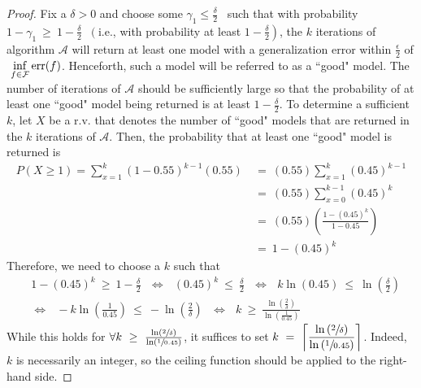 \documentclass[twoside,11pt]{homework}
\DeclarePairedDelimiter{\2norm}{\lVert}{\rVert^2_2}
\newcommand{\1}[1]{\mathds{1}\left[#1\right]}
\begin{document}
\begin{proof}
\noindent
Fix a $\delta > 0$ and choose some $\gamma_1 \leq \frac{\delta}{2}$ \ such that with probability $1- \gamma_1 \ \geq \ 1 - \frac{\delta}{2} \ $ $\left(\right.$i.e., with probability at least $\left.  1 - \frac{\delta}{2}\right)$, the $k$ iterations of algorithm $\mathcal{A}$ will return at least one model with a generalization error within $\frac{\epsilon}{2}$  of $ \ \mathlarger{\inf_{f \in \mathcal{F}}\text{err}(f)}$. Henceforth, such a model will be referred to as a ``good" model. The number of iterations of $\mathcal{A}$ should be sufficiently large so that the probability of at least one ``good" model being returned is at least $1 - \frac{\delta}{2}$. To determine a sufficient $k$, let $X$ be a r.v. that denotes the number of ``good" models that are returned in the $k$ iterations of $\mathcal{A}$. Then, the probability that at least one ``good" model is returned is
\begin{align*}
P(X \geq 1) = \sum_{x = 1}^k  (1-0.55)^{k-1}(0.55) \ & = \ (0.55)\sum_{x = 1}^k  (0.45)^{k-1} \\[0.5em]
& = \ (0.55)\sum_{x = 0}^{k-1}  (0.45)^{k} \\[0.5em]
& = \ (0.55)\left(\frac{1 - (0.45)^k}{1 - 0.45}\right) \\[0.5em]
& = \ 1 - (0.45)^k
\end{align*}
Therefore, we need to choose a $k$ such that
\begin{align*}
& 1 - (0.45)^k \ \geq \ 1 - \frac{\delta}{2} \ \ \ \Longleftrightarrow \ \ \ (0.45)^k \ \leq \ \frac{\delta}{2}
\ \ \ \Longleftrightarrow \ \ \ k\ln(0.45) \ \leq \ \ln\left(\frac{\delta}{2}\right)\\[0.5em]
& \Longleftrightarrow \ \ \ -k\ln\left(\frac{1}{0.45}\right) \ \leq \ -\ln\left(\frac{2}{\delta}\right) \ \ \ \Longleftrightarrow \ \ \ k \ \geq \ \frac{\ln\left(\frac{2}{\delta}\right)}{\ln\left(\frac{1}{0.45}\right)}
\end{align*}
While this holds for $\forall k \ \geq \ \frac{\ln\left(\sfrac{2}{\delta}\right)}{\ln\left(\sfrac{1}{0.45}\right)}$, it suffices to set $k \ = \ \mathlarger{\left\lceil\frac{\ln\left(\sfrac{2}{\delta}\right)}{\ln\left(\sfrac{1}{0.45}\right)}\right\rceil}$. Indeed, $k$ is necessarily an integer, so the ceiling function should be applied to the right-hand side. %

\end{proof}
\end{document}
